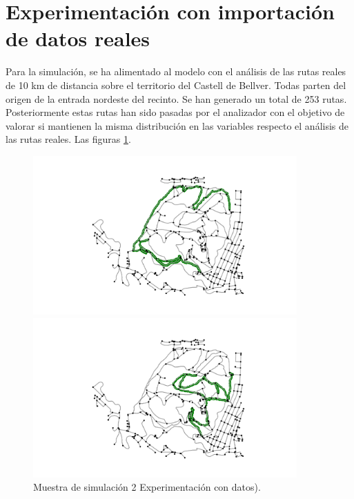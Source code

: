 \section{Experimentación con importación de datos reales}
Para la simulación, se ha alimentado al modelo con el análisis de las rutas reales de 10 km de distancia sobre 
el territorio del Castell de Bellver. Todas parten del origen de la entrada nordeste del recinto. Se han generado un total de 253 rutas. Posteriormente estas rutas han sido pasadas por el analizador con el objetivo de valorar si mantienen la misma distribución en las variables respecto el análisis de las rutas reales. Las figuras \ref{figure:SimulatedTrack1}.
\begin{figure}[!htb]
\centering
\begin{minipage}{0.70\textwidth}
\includegraphics[width=0.9\textwidth]{./Imagenes/SimulatedTrack1.png}
\caption{Muestra de simulación 1 Experimentación con datos).}
\label{figure:SimulatedTrack1}
\end{minipage}
\begin{minipage}{0.48\textwidth}
\includegraphics[width=0.9\textwidth]{./Imagenes/SimulatedTrack2.png}
\caption{Muestra de simulación 2 Experimentación con datos).}

\end{minipage}
\end{figure}
